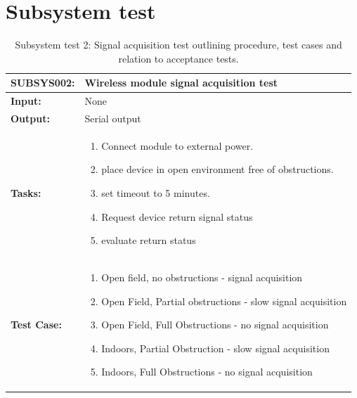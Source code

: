 \section{Subsystem test}
\begin{table}[H]
    \centering
    \caption{Subsystem test 2: Signal acquisition test outlining procedure, test cases and relation to acceptance tests.}
    \begin{tabular}{|m{}|m{}|}
    \hline
       \textbf{SUBSYS002: }  &  Wireless module signal acquisition test\\
       \hline
        \textbf{Input: } &  None\\
        \hline
        \textbf{Output: } & Serial output\\
        \hline
        \textbf{Tasks: } & \begin{enumerate}
        \vspace{1mm}
            \item Connect module to external power.
            \item place device in open environment free of obstructions.
            \item set timeout to 5 minutes.
            \item Request device return signal status
            \item evaluate return status
        \end{enumerate}\\
        \hline
        \textbf{Test Case: } & \begin{enumerate}
            \vspace{1mm}
            \item Open field, no obstructions - signal acquisition
            \item Open Field, Partial obstructions - slow signal acquisition
            \item Open Field, Full Obstructions - no signal acquisition
            \item Indoors, Partial Obstruction - slow signal acquisition
            \item Indoors, Full Obstructions - no signal acquisition
        \end{enumerate}\\
        \hline

    \end{tabular}
    \label{tab:SUBSYS002}
\end{table}


